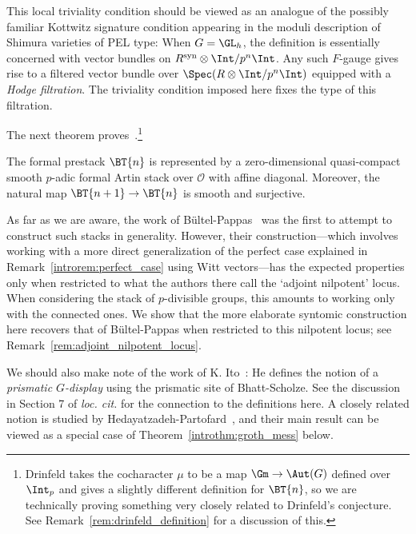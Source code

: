 \documentclass[10pt]{amsart}
\begin{document}
\begin{introrem}
This local triviality condition should be viewed as an analogue of the possibly familiar Kottwitz signature condition appearing in the moduli description of Shimura varieties of PEL type: When $G = \GL_h$, the definition is essentially concerned with vector bundles on $R^{\mathrm{syn}}\otimes\Int/p^n\Int$. Any such $F$-gauge gives rise to a filtered vector bundle over $\Spec(R\otimes\Int/p^n\Int)$ equipped with a \emph{Hodge filtration}. The triviality condition imposed here fixes the type of this filtration.
\end{introrem}

The next theorem proves~\cite[Conjecture C.3.1]{drinfeld2023shimurian}.\footnote{Drinfeld takes the cocharacter $\mu$ to be a map $\Gm\to \Aut(G)$ defined over $\Int_p$ and gives a slightly different definition for $\BT{n}$, so we are technically proving something very closely related to Drinfeld's conjecture. See Remark~\ref{rem:drinfeld_definition} for a discussion of this.}

\begin{introthm}
\label{introthm:main}
The formal prestack $\BT{n}$ is represented by a zero-dimensional quasi-compact smooth $p$-adic formal Artin stack over $\mathcal{O}$ with affine diagonal. Moreover, the natural map $\BT{n+1}\to \BT{n}$ is smooth and surjective.
\end{introthm}


\begin{introrem}
\label{introrem:bp}
As far as we are aware, the work of B\"ultel-Pappas~\cite{MR4120808} was the first to attempt to construct such stacks in generality. However, their construction---which involves working with a more direct generalization of the perfect case explained in Remark~\ref{introrem:perfect_case} using Witt vectors---has the expected properties only when restricted to what the authors there call the `adjoint nilpotent' locus. When considering the stack of $p$-divisible groups, this amounts to working only with the connected ones. We show that the more elaborate syntomic construction here recovers that of B\"ultel-Pappas when restricted to this nilpotent locus; see Remark~\ref{rem:adjoint_nilpotent_locus}.

We should also make note of the work of K. Ito~\cite{ito2024prismaticgdisplaysdescenttheory}: He defines the notion of a \emph{prismatic $G$-display} using the prismatic site of Bhatt-Scholze. See the discussion in Section 7 of \emph{loc. cit.} for the connection to the definitions here. A closely related notion is studied by Hedayatzadeh-Partofard~\cite{hedayatzadeh_partofard}, and their main result can be viewed as a special case of Theorem~\ref{introthm:groth_mess} below.
\end{introrem}
\end{document}
